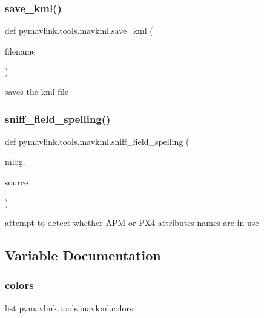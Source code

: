 \subsubsection{\texorpdfstring{save\+\_\+kml()}{save\_kml()}}
{\footnotesize\ttfamily def pymavlink.\+tools.\+mavkml.\+save\+\_\+kml (\begin{DoxyParamCaption}\item[{}]{filename }\end{DoxyParamCaption})}

\begin{DoxyVerb}saves the kml file\end{DoxyVerb}
 \mbox{\label{namespacepymavlink_1_1tools_1_1mavkml_a8ad19bfa7dde8905f7ad26695e780678}} 
\subsubsection{\texorpdfstring{sniff\+\_\+field\+\_\+spelling()}{sniff\_field\_spelling()}}
{\footnotesize\ttfamily def pymavlink.\+tools.\+mavkml.\+sniff\+\_\+field\+\_\+spelling (\begin{DoxyParamCaption}\item[{}]{mlog,  }\item[{}]{source }\end{DoxyParamCaption})}

\begin{DoxyVerb}attempt to detect whether APM or PX4 attributes names are in use\end{DoxyVerb}
 

\subsection{Variable Documentation}
\mbox{\label{namespacepymavlink_1_1tools_1_1mavkml_ab297c6177e8f218c288309ff24bacbac}} 
\subsubsection{\texorpdfstring{colors}{colors}}
{\footnotesize\ttfamily list pymavlink.\+tools.\+mavkml.\+colors}

